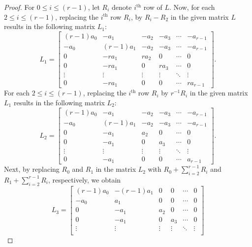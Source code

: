 \documentclass[conference]{IEEEtran}
\begin{document}
\begin{proof} For $0\leq i\leq (r-1)$, let $R_{i}$ denote $i^{\text{th}}$ row of $L$. Now, for each $2\leq i\leq (r-1)$, replacing the $i^{\text{th}}$ row $R_{i}$,  by $R_{i}-R_{2}$ in the given matrix $L$ results in the following matrix $L_{1}$:
\begin{equation*}
L_{1} =
\begin{bmatrix}
(r-1)a_{0} & -a_{1} & -a_{2} & -a_{3} & \cdots & -a_{r-1} \\
-a_{0} & (r-1)a_{1} & -a_{2} & -a_{3} & \cdots & -a_{r-1} \\
0 & -ra_{1} & ra_{2} & 0 & \cdots & 0 \\
0 & -ra_{1} & 0 & ra_{3} & \cdots & 0 \\
\vdots & \vdots & \vdots & \vdots & \ddots & \vdots \\
0 & -ra_{1} & 0 & 0 & \cdots & ra_{r-1}
\end{bmatrix}.
\end{equation*}
For each $2\leq i\leq (r-1)$, replacing the $i^{\text{th}}$ row $R_{i}$ by $r^{-1}R_{i}$ in the given matrix $L_{1}$ results in the following matrix $L_{2}$:
\begin{equation*}
L_{2} =
\begin{bmatrix}
(r-1)a_{0} & -a_{1} & -a_{2} & -a_{3} & \cdots & -a_{r-1} \\
-a_{0} & (r-1)a_{1} & -a_{2} & -a_{3} & \cdots & -a_{r-1} \\
0 & -a_{1} & a_{2} & 0 & \cdots & 0 \\
0 & -a_{1} & 0 & a_{3} & \cdots & 0 \\
\vdots & \vdots & \vdots & \vdots & \ddots & \vdots \\
0 & -a_{1} & 0 & 0 & \cdots & a_{r-1}
\end{bmatrix}.
\end{equation*}
Next, by replacing $R_{0}$ and $R_{1}$ in the matrix $L_{2}$ with $R_{0} + \sum_{i=2}^{r-1} R_{i}$ and $R_{1} + \sum_{i=2}^{r-1} R_{i}$, respectively, we obtain
\begin{equation*}
L_{3} =
\begin{bmatrix}
(r-1)a_{0} & -(r-1)a_{1} & 0 & 0 & \cdots & 0 \\
-a_{0} & a_{1} & 0 & 0 & \cdots & 0 \\
0 & -a_{1} & a_{2} & 0 & \cdots & 0 \\
0 & -a_{1} & 0 & a_{3} & \cdots & 0 \\
\vdots & \vdots & \vdots & \vdots & \ddots & \vdots \\

\end{bmatrix}
\end{equation*}
\end{proof}
\end{document}
